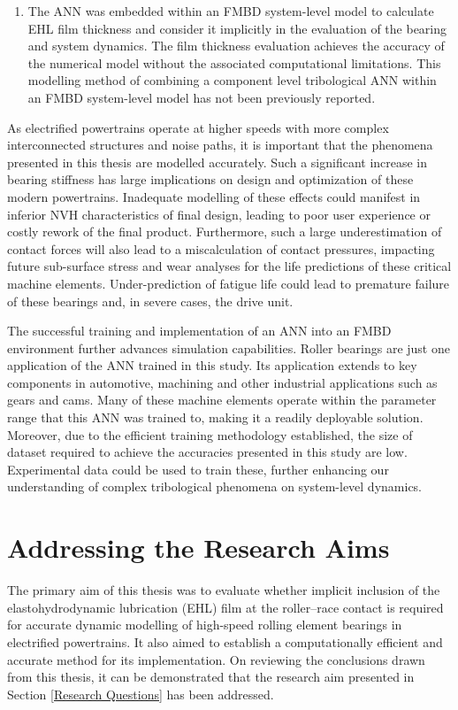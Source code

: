 \begin{enumerate}
	\item The ANN was embedded within an FMBD system-level model to calculate EHL film thickness and consider it implicitly in the evaluation of the bearing and system dynamics. The film thickness evaluation achieves the accuracy of the numerical model without the associated computational limitations. This modelling method of combining a component level tribological ANN within an FMBD system-level model has not been previously reported.
\end{enumerate}

As electrified powertrains operate at higher speeds with more complex interconnected structures and noise paths, it is important that the phenomena presented in this thesis are modelled accurately. Such a significant increase in bearing stiffness has large implications on design and optimization of these modern powertrains. Inadequate modelling of these effects could manifest in inferior NVH characteristics of final design, leading to poor user experience or costly rework of the final product. Furthermore, such a large underestimation of contact forces will also lead to a miscalculation of contact pressures, impacting future sub-surface stress and wear analyses for the life predictions of these critical machine elements. Under-prediction of fatigue life could lead to premature failure of these bearings and, in severe cases, the drive unit. 

The successful training and implementation of an ANN into an FMBD environment further advances simulation capabilities. Roller bearings are just one application of the ANN trained in this study. Its application extends to key components in automotive, machining and other industrial applications such as gears and cams. Many of these machine elements operate within the parameter range that this ANN was trained to, making it a readily deployable solution. Moreover, due to the efficient training methodology established, the size of dataset required to achieve the accuracies presented in this study are low. Experimental data could be used to train these, further enhancing our understanding of complex tribological phenomena on system-level dynamics.

\section{Addressing the Research Aims}
The primary aim of this thesis was to evaluate whether implicit inclusion of the elastohydrodynamic lubrication (EHL) film at the roller–race contact is required for accurate dynamic modelling of high-speed rolling element bearings in electrified powertrains. It also aimed to establish a computationally efficient and accurate method for its implementation. On reviewing the conclusions drawn from this thesis, it can be demonstrated that the research aim presented in Section \ref{Research Questions} has been addressed.

